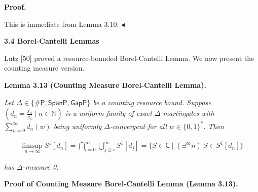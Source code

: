 \documentclass[10pt,a4paper]{article}
\begin{document}




\par\medskip\noindent\textbf{Proof.}\par




This is immediate from Lemma 3.10.
$\blacktriangleleft$\par






\par\medskip\noindent\textbf{
3.4 Borel-Cantelli Lemmas}\par




Lutz [50] proved a resource-bounded Borel-Cantelli Lemma. We now
present the counting measure version.\par





\par\medskip\noindent\textbf{
\textbf{Lemma 3.13}\textbf{ }(Counting Measure Borel-Cantelli Lemma)\textbf{.}
}\par



\emph{Let $\Delta\in\{{\mathsf{\#}\mathsf{P}},\mathsf{SpanP},\mathsf{GapP}\}$ be a counting resource bound.
Suppose $(d_{n}=\frac{f_{n}}{g_{n}}\mid n\in\mathbb{N})$ is a uniform family of exact
$\Delta$-martingales with $\sum_{n=0}^{\infty}d_{n}(w)$ being uniformly
$\Delta$-convergent for all $w\in\{0,1\}^{*}$.
Then}\par


\[\begin{gathered}
\limsup\limits_{n\to\infty}S^{1}[d_{n}]=\bigcap_{i=0}^{\infty}\bigcup_{j\geq i}^{\infty}S^{1}[d_{j}]=\{S\in\mathsf{C}\mid(\exists^{\infty}n)\ S\in S^{1}[d_{n}]\}
\end{gathered}\]


\emph{has $\Delta$-measure 0.}\par






\par\medskip\noindent\textbf{Proof of Counting Measure Borel-Cantelli Lemma (Lemma 3.13).}\par
\end{document}
